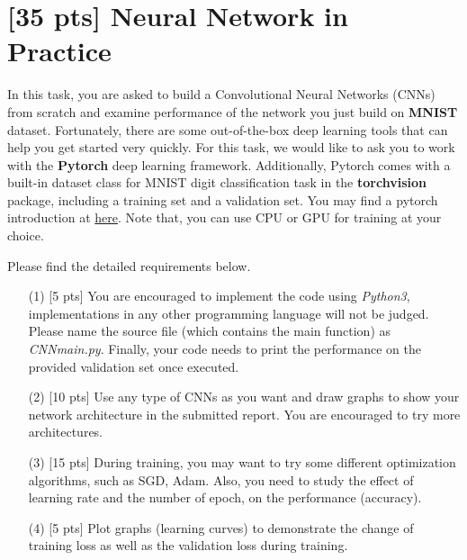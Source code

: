 \documentclass{article}
\begin{document}
	
	\vspace{3cm}
	
	\section{[35 pts] Neural Network in Practice}
	
	In this task, you are asked to build a Convolutional Neural Networks (CNNs) from scratch and examine performance of the network you just build on \textbf{MNIST} dataset.
	Fortunately, there are some out-of-the-box deep learning tools that can help you get started very quickly. For this task, we would like to ask you to work with the \textbf{Pytorch} deep learning framework. Additionally, Pytorch comes with a built-in dataset class for MNIST digit classification task in the \textbf{torchvision} package, including a training set and a validation set. You may find a pytorch introduction at \href{https://pytorch.org/tutorials/beginner/blitz/cifar10_tutorial.html}{here}. Note that, you can use CPU or GPU for training at your choice.
	
	Please find the detailed requirements below.
	
	\begin{enumerate}
		    \item[(1)] [5 pts] You are encouraged to implement the code using \emph{Python3}, implementations in any other programming language will not be judged. Please name the source file (which contains the main function) as \emph{CNN\underline{\hspace{0.5em}}main.py}. Finally, your code needs to print the performance on the provided validation set once executed.
		    
		    \item[(2)] [10 pts] Use any type of CNNs as you want and draw graphs to show your network architecture in the submitted report. You are encouraged to try more architectures.
		    
		    \item [(3)] [15 pts] During training, you may want to try some different optimization algorithms, such as SGD, Adam. Also, you need to study the effect of learning rate and the number of epoch, on the performance (accuracy).
		    
		    \item [(4)] [5 pts] Plot graphs (learning curves) to demonstrate the change of training loss as well as the validation loss during training.
	\end{enumerate}
\end{document}
